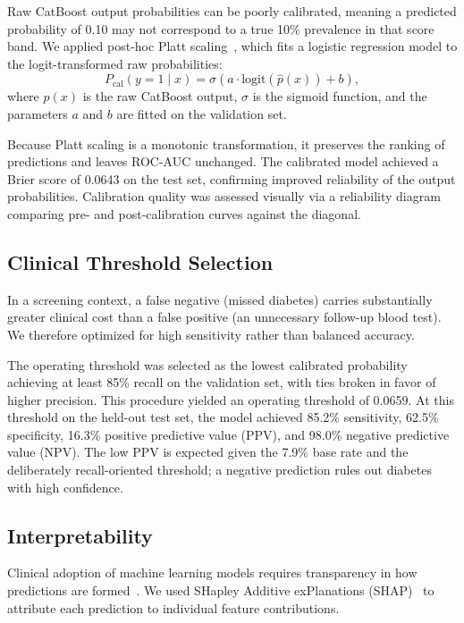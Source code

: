 Raw CatBoost output probabilities can be poorly calibrated, meaning a predicted probability of 0.10 may not correspond to a true 10\% prevalence in that score band. We applied post-hoc Platt scaling~\cite{Platt1999calibration}, which fits a logistic regression model to the logit-transformed raw probabilities:
\begin{equation}
\label{eq:platt}
P_{\text{cal}}(y=1 \mid x) = \sigma(a \cdot \text{logit}(\hat{p}(x)) + b),
\end{equation}
where $\hat{p}(x)$ is the raw CatBoost output, $\sigma$ is the sigmoid function, and the parameters $a$ and $b$ are fitted on the validation set.

Because Platt scaling is a monotonic transformation, it preserves the ranking of predictions and leaves ROC-AUC unchanged. The calibrated model achieved a Brier score of 0.0643 on the test set, confirming improved reliability of the output probabilities. Calibration quality was assessed visually via a reliability diagram comparing pre- and post-calibration curves against the diagonal.

\subsection{Clinical Threshold Selection}
\label{subsec:threshold}

In a screening context, a false negative (missed diabetes) carries substantially greater clinical cost than a false positive (an unnecessary follow-up blood test). We therefore optimized for high sensitivity rather than balanced accuracy.

The operating threshold was selected as the lowest calibrated probability achieving at least 85\% recall on the validation set, with ties broken in favor of higher precision. This procedure yielded an operating threshold of 0.0659. At this threshold on the held-out test set, the model achieved 85.2\% sensitivity, 62.5\% specificity, 16.3\% positive predictive value (PPV), and 98.0\% negative predictive value (NPV). The low PPV is expected given the 7.9\% base rate and the deliberately recall-oriented threshold; a negative prediction rules out diabetes with high confidence.

\subsection{Interpretability}
\label{subsec:interpretability}

Clinical adoption of machine learning models requires transparency in how predictions are formed~\cite{Deng2025highauc}. We used SHapley Additive exPlanations (SHAP)~\cite{Lundberg2017shap} to attribute each prediction to individual feature contributions.

